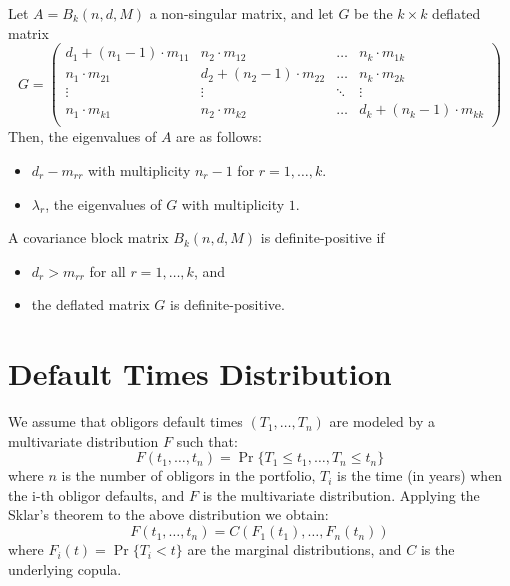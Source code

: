 \documentclass[11pt,fleqn]{book} %
\begin{document}
\begin{proposition}
\label{prop1}
Let $A = B_k(n, d, M)$ a non-singular matrix, and let $G$ be the $k \times k$ 
deflated matrix
\begin{displaymath}
G =
\left( \begin{array}{cccc}
d_1+(n_1-1)\cdot m_{11} & n_2 \cdot m_{12}        & \dots  & n_k \cdot m_{1k} \\
n_1\cdot m_{21}         & d_2+(n_2-1)\cdot m_{22} & \dots  & n_k \cdot m_{2k} \\
\vdots                  & \vdots                  & \ddots & \vdots \\
n_1\cdot m_{k1}         & n_2 \cdot m_{k2}        & \dots  & d_k+(n_k-1)\cdot m_{kk} \\
\end{array} \right)
\end{displaymath}
Then, the eigenvalues of $A$ are as follows:
\begin{itemize}
\item $d_{r}-m_{rr}$ with multiplicity $n_r-1$ for $r=1,\dots,k$.
\item $\lambda_r$, the eigenvalues of $G$ with multiplicity $1$.
\end{itemize}
\end{proposition}

\begin{corollary}
A covariance block matrix $B_k(n,d,M)$ is definite-positive if
\begin{itemize}
\item $d_r > m_{rr}$ for all $r=1,\dots,k$, and
\item the deflated matrix $G$ is definite-positive.
\end{itemize}
\end{corollary}


\section{Default Times Distribution}

We assume that obligors default times $(T_1, \dots, T_n)$ are modeled 
by a multivariate distribution $F$ such that:
\begin{displaymath}
F(t_1, \dots, t_n) = \Pr \{T_1 \le t_1, \dots, T_n \le t_n\}
\end{displaymath}
where $n$ is the number of obligors in the portfolio, $T_i$ is the time 
(in years) when the i-th obligor defaults, and $F$ is the multivariate
distribution. Applying the Sklar's theorem to the above distribution 
we obtain:
\begin{displaymath}
F(t_1, \dots, t_n) = C\left(F_1(t_1), \dots, F_n(t_n)\right) 
\end{displaymath}
where $F_i(t) = \Pr\{T_i < t\}$ are the marginal distributions, 
and $C$ is the underlying copula.
\end{document}
